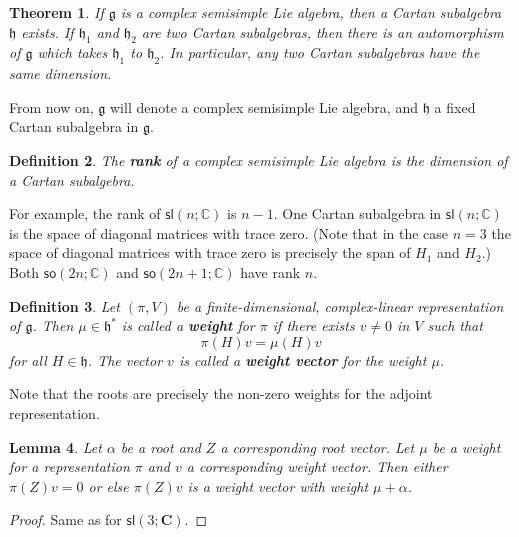 \documentclass[12pt]{amsbook}
\let \frak = \mathfrak
\theoremstyle{plain}
\newtheorem{theorem}{Theorem}
\newtheorem{definition}[theorem]{Definition}
\newtheorem{lemma}[theorem]{Lemma}
\numberwithin{equation}{chapter}
\numberwithin{theorem}{chapter}
\begin{document}
\begin{theorem}
If $\frak{g}$ is a complex semisimple Lie algebra, then a Cartan subalgebra
$\frak{h}$ exists. If $\frak{h}_{1}$ and $\frak{h}_{2}$ are two Cartan
subalgebras, then there is an automorphism of $\frak{g}$ which takes
$\frak{h}_{1}$ to $\frak{h}_{2}$. In particular, any two Cartan subalgebras
have the same dimension.
\end{theorem}

From now on, $\frak{g}$ will denote a complex semisimple Lie algebra, and
$\frak{h}$ a fixed Cartan subalgebra in $\frak{g}$.

\begin{definition}
The \textbf{rank} of a complex semisimple Lie algebra is the dimension of a
Cartan subalgebra.
\end{definition}

For example, the rank of $\mathsf{sl}\left(  n;\mathbb{C}\right)  $ is $n-1$.
One Cartan subalgebra in $\mathsf{sl}\left(  n;\mathbb{C}\right)  $ is the
space of diagonal matrices with trace zero. (Note that in the case $n=3$ the
space of diagonal matrices with trace zero is precisely the span of $H_{1}$
and $H_{2}$.) Both $\mathsf{so}(2n;\mathbb{C})$ and $\mathsf{so}%
(2n+1;\mathbb{C})$ have rank $n$.

\begin{definition}
Let $\left(  \pi,V\right)  $ be a finite-dimensional, complex-linear
representation of $\frak{g}$. Then $\mu\in\frak{h}^{\ast}$ is called a
\textbf{weight} for $\pi$ if there exists $v\neq0$ in $V$ such that
\[
\pi(H)v=\mu(H)v
\]
for all $H\in\frak{h}$. The vector $v$ is called a \textbf{weight vector} for
the weight $\mu$.
\end{definition}

Note that the roots are precisely the non-zero weights for the adjoint representation.

\begin{lemma}
Let $\alpha$ be a root and $Z$ a corresponding root vector. Let $\mu$ be a
weight for a representation $\pi$ and $v$ a corresponding weight vector. Then
either $\pi(Z)v=0$ or else $\pi(Z)v$ is a weight vector with weight
$\mu+\alpha$.
\end{lemma}

\begin{proof}
Same as for $\mathsf{sl}\left(  3;\mathbf{C}\right)  $.
\end{proof}
\end{document}
